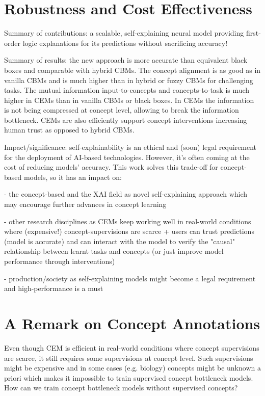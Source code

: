 \documentclass[withindex,glossary]{cam-thesis}
\theoremstyle{plain}
\theoremstyle{definition}
\theoremstyle{remark}
\begin{document}
\section{Robustness and Cost Effectiveness}

Summary of contributions: a scalable, self-explaining neural model providing first-order logic explanations for its predictions without sacrificing accuracy!

Summary of results: the new approach is more accurate than equivalent black boxes and comparable with hybrid CBMs. The concept alignment is as good as in vanilla CBMs and is much higher than in hybrid or fuzzy CBMs for challenging tasks. The mutual information input-to-concepts and concepts-to-task is much higher in CEMs than in vanilla CBMs or black boxes. In CEMs the information is not being compressed at concept level, allowing to break the information bottleneck. CEMs are also efficiently support concept interventions increasing human trust as opposed to hybrid CBMs.

Impact/significance: self-explainability is an ethical and (soon) legal requirement for the deployment of AI-based technologies. However, it's often coming at the cost of reducing models' accuracy. This work solves this trade-off for concept-based models, so it has an impact on:

- the concept-based and the XAI field as novel self-explaining approach which may encourage further advances in concept learning

- other research disciplines as CEMs keep working well in real-world conditions where (expensive!) concept-supervisions are scarce + users can trust predictions (model is accurate) and can interact with the model to verify the "causal" relationship between learnt tasks and concepts (or just improve model performance through interventions)

- production/society as self-explaining models might become a legal requirement and high-performance is a must

\section{A Remark on Concept Annotations}
Even though CEM is efficient in real-world conditions where concept supervisions are scarce, it still requires some supervisions at concept level. Such supervisions might be expensive and in some cases (e.g. biology) concepts might be unknown a priori which makes it impossible to train supervised concept bottleneck models. How can we train concept bottleneck models without supervised concepts?
\end{document}
